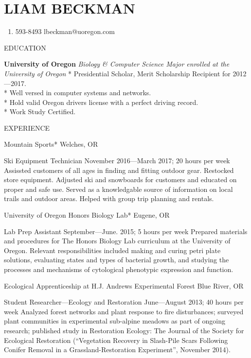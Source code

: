 \section{LIAM BECKMAN}\label{liam-beckman}

\begin{enumerate}
\def\labelenumi{(\arabic{enumi})}
\setcounter{enumi}{502}
\tightlist
\item
  593-8493 \textbar{} lbeckman@uoregon.com
\end{enumerate}

EDUCATION

\textbf{University of Oregon }\emph{Biology \& Computer Science Major
enrolled at the University of Oregon} * Presidential Scholar, Merit
Scholarship Recipient for 2012---2017.\\
* Well versed in computer systems and networks.\\
* Hold valid Oregon drivers license with a perfect driving record.\\
* Work Study Certified.

EXPERIENCE

Mountain Sports* {Welches, OR}

Ski Equipment Technician November 2016---March 2017; 20 hours per week
Assissted customers of all ages in finding and fitting outdoor gear.
Restocked store equipment. Adjusted ski and snowboards for customers and
educated on proper and safe use. Served as a knowledgable source of
information on local trails and outdoor areas. Helped with group trip
planning and rentals.

University of Oregon Honors Biology Lab* {Eugene, OR}

Lab Prep Assistant September---June. 2015; 5 hours per week Prepared
materials and procedures for The Honors Biology Lab curriculum at the
University of Oregon. Relevant responsibilities included making and
curing petri plate solutions, evaluating states and types of bacterial
growth, and studying the processes and mechanisms of cytological
phenotypic expression and function.

Ecological Apprenticeship at H.J. Andrews Experimental Forest {Blue
River, OR}

Student Researcher---Ecology and Restoration June---August 2013; 40
hours per week Analyzed forest networks and plant response to fire
disturbances; surveyed plant communities in experimental sub-alpine
meadows as part of ongoing research; published study in Restoration
Ecology: The Journal of the Society for Ecological Restoration
(``Vegetation Recovery in Slash-Pile Scars Following Conifer Removal in
a Grassland-Restoration Experiment'', November 2014).

